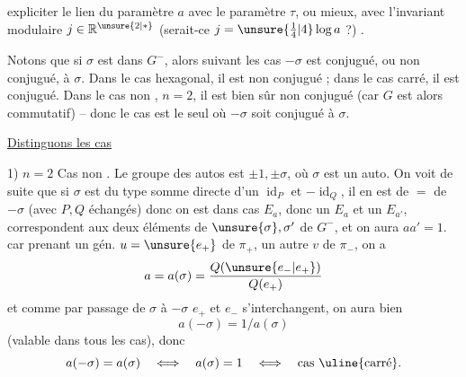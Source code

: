 expliciter le lien du paramètre $a$ avec le paramètre $\tau$, ou
mieux, avec l'invariant modulaire $j\in\mathbb R^{\unsure{2|*}}$ (serait-ce
$j=\unsure{\tfrac14|4}\log a$ ?)
.

 Notons que si $\sigma$ est dans $G^-$, alors
suivant les cas $-\sigma$ est conjugué, ou non conjugué,
à $\sigma$. 
Dans le cas hexagonal, il est non conjugué ;
dans le cas carré, il est conjugué. Dans le cas
non , $n=2$, il est bien sûr non conjugué (car
$G$ est alors commutatif) -- donc le cas  est
le seul où $-\sigma$  soit  conjugué à $\sigma$.

\uline{Distinguons les cas}

1) \uline{$n=2$} Cas non . Le groupe des autos
est $\pm1,\pm\sigma$, où $\sigma$ est un  auto. On voit de
suite que si $\sigma$ est du type somme directe d'un
$\operatorname{id}_P$ et $-\operatorname{id}_Q$, il en est de $=$ de $-\sigma$ (avec $P,Q$
échangés) donc on est dans cas $E_a$,  donc
un $E_a$ et un $E_{a'}$, correspondent aux deux éléments de
$\unsure{\sigma},\sigma'$ de $G^-$, et on aura $aa'=1$.
 car
prenant un gén. $u=\unsure{e_+}$ de $\pi_+$, un autre $v$ de $\pi_-$, on a
\[
a=a(\sigma)=\frac{Q(\unsure{e_-|e_+})}{Q(e_+)}
\]
et comme par passage de $\sigma$ à $-\sigma$  $e_+$ et $e_-$ s'interchangent,
on aura bien
\[
a(-\sigma)=1/a(\sigma)
\]
(valable dans tous les cas), donc
\[
a(-\sigma)=a(\sigma)\quad\Longleftrightarrow\quad a(\sigma)=1\quad\Longleftrightarrow\quad\text{cas \uline{carré}}.
\]
